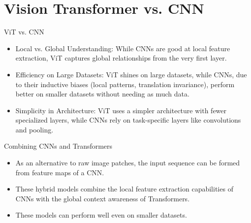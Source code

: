 \section{Vision Transformer vs. CNN}

\begin{frame}{ViT vs. CNN}
    \begin{itemize}
        \item Local vs. Global Understanding: While CNNs are good at local feature extraction, ViT captures global relationships from the very first layer.
	    \item Efficiency on Large Datasets: ViT shines on large datasets, while CNNs, due to their inductive biases (local patterns, translation invariance), perform better on smaller datasets without needing as much data.
	    \item Simplicity in Architecture: ViT uses a simpler architecture with fewer specialized layers, while CNNs rely on task-specific layers like convolutions and pooling.
    \end{itemize}
\end{frame}

\begin{frame}{Combining CNNs and Transformers}
    \begin{itemize}
        \item As an alternative to raw image patches, the input sequence can be formed from feature maps of a CNN.
	    \item These hybrid models combine the local feature extraction capabilities of CNNs with the global context awareness of Transformers. 
        \item These models can perform well even on smaller datasets.
    \end{itemize}
\end{frame}

